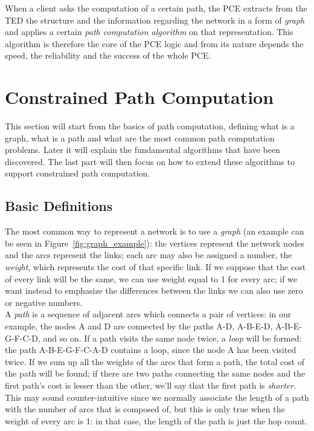 \documentclass[10pt,a4paper]{report}
\begin{document}
When a client asks the computation of a certain path, the PCE extracts
from the TED the structure and the information regarding the network
in a form of \textit{graph} and applies a certain \textit{path
  computation algorithm} on that representation. This algorithm is
therefore the core of the PCE logic and from its nature depends the
speed, the reliability and the success of the whole PCE.

\section{Constrained Path Computation}

This section will start from the basics of path computation, defining
what is a graph, what is a path and what are the most common path
computation problems. Later it will explain the fundamental algorithms
that have been discovered. The last part will then focus on how to
extend these algorithms to support constrained path computation.

\subsection{Basic Definitions}

The most common way to represent a network is to use a \textit{graph}
(an example can be seen in Figure~\ref{fig:graph_example}): the
vertices represent the network nodes and the arcs represent the links;
each arc may also be assigned a number, the \textit{weight}, which
represents the cost of that specific link. If we suppose that the cost
of every link will be the same, we can use weight equal to 1 for every
arc; if we want instead to emphasize the differences between the links
we can also use zero or negative numbers. \\
A \textit{path} is a sequence of adjacent arcs which connects a pair
of vertices: in our example, the nodes A and D are connected by the
paths A-D, A-B-E-D, A-B-E-G-F-C-D, and so on. If a path visits the
same node twice, a \textit{loop} will be formed: the path
A-B-E-G-F-C-A-D contains a loop, since the node A has been visited
twice. If we sum up all the weights of the arcs that form a path, the
total cost of the path will be found; if there are two paths
connecting the same nodes and the first path's cost is lesser than the
other, we'll say that the first path is \textit{shorter}. This may
sound counter-intuitive since we normally associate the length of a
path with the number of arcs that is composed of, but this is only true
when the weight of every arc is 1: in that case, the length of the
path is just the hop count.
\end{document}
